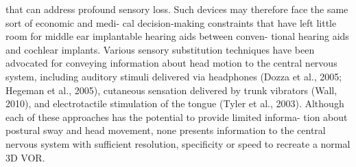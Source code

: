 that can address profound sensory loss. Such devices may therefore face the same sort of economic and medi- cal decision-making constraints that have left little room for middle ear implantable hearing aids between conven- tional hearing aids and cochlear implants.
Various sensory substitution techniques have been advocated for conveying information about head motion to the central nervous system, including auditory stimuli delivered via headphones (Dozza et al., 2005; Hegeman et al., 2005), cutaneous sensation delivered by trunk vibrators (Wall, 2010), and electrotactile stimulation of the tongue (Tyler et al., 2003). Although each of these approaches has the potential to provide limited informa- tion about postural sway and head movement, none presents information to the central nervous system with sufficient resolution, specificity or speed to recreate a normal 3D VOR.